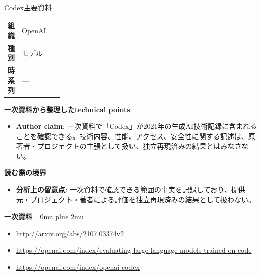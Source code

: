 \begin{technicalnote}{Codex}{主要資料}
\begingroup
\begin{tabularx}{\linewidth}{@{}>{\bfseries}p{0.22\linewidth}X@{}}
組織 & OpenAI \\
種別 & モデル \\
時系列 & — \\
\end{tabularx}
\smallskip
{\bfseries 一次資料から整理したtechnical points}
\begin{itemize}[leftmargin=1.5em,itemsep=0.35em]
\item \textbf{Author claim}: 一次資料で「Codex」が2021年の生成AI技術記録に含まれることを確認できる。技術内容、性能、アクセス、安全性に関する記述は、原著者・プロジェクトの主張として扱い、独立再現済みの結果とはみなさない。
\end{itemize}
\begin{minipage}{\linewidth}
{\bfseries 読む際の境界}
\begin{itemize}[leftmargin=1.5em,itemsep=0.35em]
\item \textbf{分析上の留意点}: 一次資料で確認できる範囲の事実を記録しており、提供元・プロジェクト・著者による評価を独立再現済みの結果として扱わない。
\end{itemize}
\begin{samepage}
{\bfseries 一次資料}
\begingroup\sloppy
\Urlmuskip=0mu plus 2mu\relax
\begin{itemize}[leftmargin=1.5em,itemsep=0.25em]
\item {\scriptsize\url{http://arxiv.org/abs/2107.03374v2}}
\item {\scriptsize\url{https://openai.com/index/evaluating-large-language-models-trained-on-code}}
\item {\scriptsize\url{https://openai.com/index/openai-codex}}
\end{itemize}
\endgroup
\end{samepage}
\end{minipage}
\endgroup
\end{technicalnote}
\medskip


